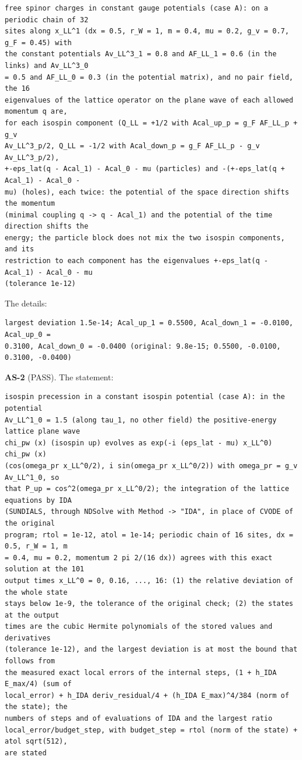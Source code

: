 \documentclass[
  10pt,
]{article}
\begin{document}
\begin{verbatim}
free spinor charges in constant gauge potentials (case A): on a periodic chain of 32
sites along x_LL^1 (dx = 0.5, r_W = 1, m = 0.4, mu = 0.2, g_v = 0.7, g_F = 0.45) with
the constant potentials Av_LL^3_1 = 0.8 and AF_LL_1 = 0.6 (in the links) and Av_LL^3_0
= 0.5 and AF_LL_0 = 0.3 (in the potential matrix), and no pair field, the 16
eigenvalues of the lattice operator on the plane wave of each allowed momentum q are,
for each isospin component (Q_LL = +1/2 with Acal_up_p = g_F AF_LL_p + g_v
Av_LL^3_p/2, Q_LL = -1/2 with Acal_down_p = g_F AF_LL_p - g_v Av_LL^3_p/2),
+-eps_lat(q - Acal_1) - Acal_0 - mu (particles) and -(+-eps_lat(q + Acal_1) - Acal_0 -
mu) (holes), each twice: the potential of the space direction shifts the momentum
(minimal coupling q -> q - Acal_1) and the potential of the time direction shifts the
energy; the particle block does not mix the two isospin components, and its
restriction to each component has the eigenvalues +-eps_lat(q - Acal_1) - Acal_0 - mu
(tolerance 1e-12)
\end{verbatim}

The details:

\begin{verbatim}
largest deviation 1.5e-14; Acal_up_1 = 0.5500, Acal_down_1 = -0.0100, Acal_up_0 =
0.3100, Acal_down_0 = -0.0400 (original: 9.8e-15; 0.5500, -0.0100, 0.3100, -0.0400)
\end{verbatim}

\textbf{AS-2} (PASS). The statement:

\begin{verbatim}
isospin precession in a constant isospin potential (case A): in the potential
Av_LL^1_0 = 1.5 (along tau_1, no other field) the positive-energy lattice plane wave
chi_pw (x) (isospin up) evolves as exp(-i (eps_lat - mu) x_LL^0) chi_pw (x)
(cos(omega_pr x_LL^0/2), i sin(omega_pr x_LL^0/2)) with omega_pr = g_v Av_LL^1_0, so
that P_up = cos^2(omega_pr x_LL^0/2); the integration of the lattice equations by IDA
(SUNDIALS, through NDSolve with Method -> "IDA", in place of CVODE of the original
program; rtol = 1e-12, atol = 1e-14; periodic chain of 16 sites, dx = 0.5, r_W = 1, m
= 0.4, mu = 0.2, momentum 2 pi 2/(16 dx)) agrees with this exact solution at the 101
output times x_LL^0 = 0, 0.16, ..., 16: (1) the relative deviation of the whole state
stays below 1e-9, the tolerance of the original check; (2) the states at the output
times are the cubic Hermite polynomials of the stored values and derivatives
(tolerance 1e-12), and the largest deviation is at most the bound that follows from
the measured exact local errors of the internal steps, (1 + h_IDA E_max/4) (sum of
local_error) + h_IDA deriv_residual/4 + (h_IDA E_max)^4/384 (norm of the state); the
numbers of steps and of evaluations of IDA and the largest ratio
local_error/budget_step, with budget_step = rtol (norm of the state) + atol sqrt(512),
are stated
\end{verbatim}
\end{document}
